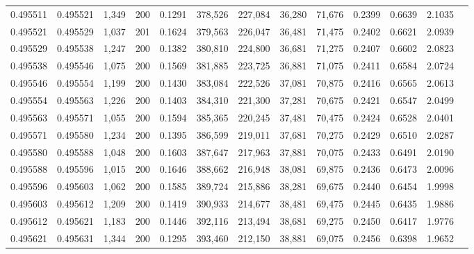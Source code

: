 \begin{tabular}{rrrrrrrrrrrrr}
0.495511 & 0.495521 & 1,349 & 200 &                                     0.1291 & 378,526 & 227,084 &  36,280 &  71,676 & 0.2399 & 0.6639 & 2.1035 \\
0.495521 & 0.495529 & 1,037 & 201 &                                     0.1624 & 379,563 & 226,047 &  36,481 &  71,475 & 0.2402 & 0.6621 & 2.0939 \\
0.495529 & 0.495538 & 1,247 & 200 &                                     0.1382 & 380,810 & 224,800 &  36,681 &  71,275 & 0.2407 & 0.6602 & 2.0823 \\
0.495538 & 0.495546 & 1,075 & 200 &                                     0.1569 & 381,885 & 223,725 &  36,881 &  71,075 & 0.2411 & 0.6584 & 2.0724 \\
0.495546 & 0.495554 & 1,199 & 200 &                                     0.1430 & 383,084 & 222,526 &  37,081 &  70,875 & 0.2416 & 0.6565 & 2.0613 \\
0.495554 & 0.495563 & 1,226 & 200 &                                     0.1403 & 384,310 & 221,300 &  37,281 &  70,675 & 0.2421 & 0.6547 & 2.0499 \\
0.495563 & 0.495571 & 1,055 & 200 &                                     0.1594 & 385,365 & 220,245 &  37,481 &  70,475 & 0.2424 & 0.6528 & 2.0401 \\
0.495571 & 0.495580 & 1,234 & 200 &                                     0.1395 & 386,599 & 219,011 &  37,681 &  70,275 & 0.2429 & 0.6510 & 2.0287 \\
0.495580 & 0.495588 & 1,048 & 200 &                                     0.1603 & 387,647 & 217,963 &  37,881 &  70,075 & 0.2433 & 0.6491 & 2.0190 \\
0.495588 & 0.495596 & 1,015 & 200 &                                     0.1646 & 388,662 & 216,948 &  38,081 &  69,875 & 0.2436 & 0.6473 & 2.0096 \\
0.495596 & 0.495603 & 1,062 & 200 &                                     0.1585 & 389,724 & 215,886 &  38,281 &  69,675 & 0.2440 & 0.6454 & 1.9998 \\
0.495603 & 0.495612 & 1,209 & 200 &                                     0.1419 & 390,933 & 214,677 &  38,481 &  69,475 & 0.2445 & 0.6435 & 1.9886 \\
0.495612 & 0.495621 & 1,183 & 200 &                                     0.1446 & 392,116 & 213,494 &  38,681 &  69,275 & 0.2450 & 0.6417 & 1.9776 \\
0.495621 & 0.495631 & 1,344 & 200 &                                     0.1295 & 393,460 & 212,150 &  38,881 &  69,075 & 0.2456 & 0.6398 & 1.9652 \\

\end{tabular}

